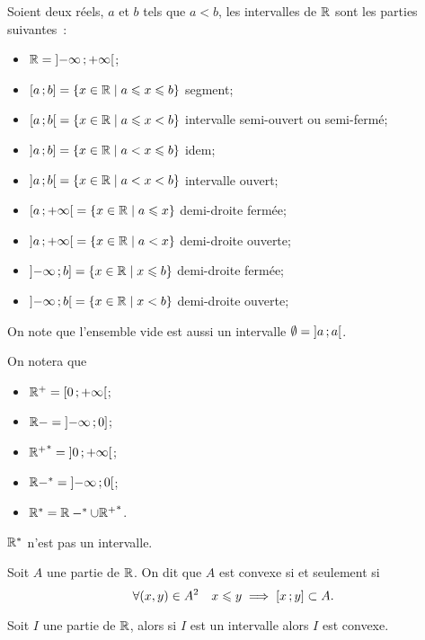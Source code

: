\begin{defdef}
  Soient deux réels, $a$ et $b$ tels que $a<b$, les intervalles de $\mathbb{R}$ sont les parties suivantes~:
  \begin{itemize}
  \item $\mathbb{R}=\left] -\infty \, ;  +\infty \right[$;
  \item $\left[ a \, ;  b \right]=\left\{x \in \mathbb{R}\mathrel{}\middle|\mathrel{}a\leqslant x \leqslant b\right\}$ segment;
  \item $\left[ a \, ;  b \right[=\left\{x \in \mathbb{R}\mathrel{}\middle|\mathrel{}a\leqslant x < b\right\}$ intervalle semi-ouvert ou semi-fermé;
  \item $\left] a \, ;  b \right]=\left\{x \in \mathbb{R}\mathrel{}\middle|\mathrel{}a< x \leqslant b\right\}$ idem;
  \item $\left] a \, ;  b \right[=\left\{x \in \mathbb{R}\mathrel{}\middle|\mathrel{}a< x < b\right\}$ intervalle ouvert;
  \item $\left[ a \, ;  +\infty \right[=\left\{x \in \mathbb{R}\mathrel{}\middle|\mathrel{}a\leqslant x\right\}$ demi-droite fermée;
  \item $\left] a \, ;  +\infty \right[=\left\{x \in \mathbb{R}\mathrel{}\middle|\mathrel{}a< x\right\}$ demi-droite ouverte;
  \item $\left] -\infty \, ;  b \right]=\left\{x \in \mathbb{R}\mathrel{}\middle|\mathrel{}x \leqslant b\right\}$ demi-droite fermée;
  \item $\left] -\infty \, ;  b \right[=\left\{x \in \mathbb{R}\mathrel{}\middle|\mathrel{}x <b\right\}$ demi-droite ouverte;
  \end{itemize}
\end{defdef}
On note que l'ensemble vide est aussi un intervalle $\emptyset=\left] a \, ;  a \right[$.
\begin{defdef}
  On notera que
  \begin{itemize}
  \item $\mathbb{R}^{+}=\left[ 0 \, ;  +\infty \right[$;
  \item $\mathbb{R}-=\left] -\infty \, ;  0 \right]$;
  \item ${\mathbb{R}^{+}}^*=\left] 0 \, ;  +\infty \right[$;
  \item $\mathbb{R}-^*=\left] -\infty \, ;  0 \right[$;
  \item $\mathbb{R}^*=\mathbb{R}-^* \cup {\mathbb{R}^{+}}^*$.
  \end{itemize}
  $\mathbb{R}^*$ n'est pas un intervalle.
\end{defdef}
\begin{defdef}
  Soit $A$ une partie de $\mathbb{R}$. On dit que $A$ est convexe si et seulement si
  \begin{equation}
    \forall (x,y) \in A^2 \quad x\leqslant y \implies \left[ x \, ;  y \right]\subset A.
  \end{equation}
\end{defdef}
\begin{theo}
  \label{theo:partieconvexe1}
  Soit $I$ une partie de $\mathbb{R}$, alors si $I$ est un intervalle alors $I$ est convexe.
\end{theo}

